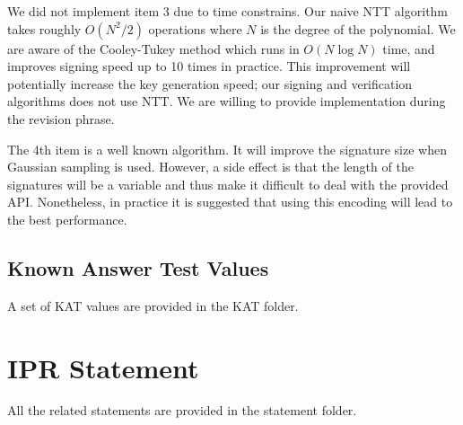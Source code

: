 \documentclass{llncs}
\newcommand{\<}{\langle}
\renewcommand{\>}{\rangle}
\begin{document}
We did not implement item 3 due to time constrains. Our naive
 NTT algorithm takes roughly $O(N^2/2)$ operations where $N$ is the degree
 of the polynomial. We are aware of the Cooley-Tukey method which runs 
in $O(N\log N)$ time, and improves signing speed up to 10 times in practice. This improvement will potentially 
increase the key generation speed; our signing and 
verification algorithms does not use NTT.
We are willing to provide implementation during the revision phrase. 

The 4th item is a well known algorithm. It will improve
the signature size when Gaussian sampling is used. However, a side effect is that the
length of the signatures will be a variable and thus
make it difficult to deal with the provided API. 
Nonetheless, in practice it is suggested that  using this 
encoding will lead to the best performance.

\subsection{Known Answer Test Values}
A set of KAT values are provided in the KAT folder.

\section{IPR Statement}
All the related statements are provided in the statement folder.




\end{document}
